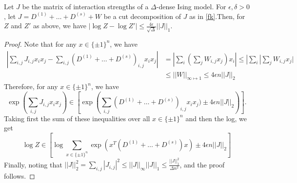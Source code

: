 \documentclass[final, 12pt]{colt2018}
\theoremstyle{definition}
\theoremstyle{plain}
\begin{document}
\begin{lemma}\label{applying-reg-lemma} Let $J$ be the matrix of interaction strengths of a $\Delta$-dense
Ising model. For $\epsilon,\delta>0$, let $J=D^{(1)}+\dots+D^{(s)}+W$
be a cut decomposition of $J$ as in \cref{fk}.Then, for $Z$ and $Z'$ as above, we have 
$|\log Z-\log Z'|\leq\frac{4\epsilon}{\sqrt{\Delta}}||J||_{1}$.

\end{lemma}
\begin{proof}
Note that for any $x\in\{\pm1\}^{n}$, we have 
\begin{align*}
|\sum_{i,j}J_{i,j}x_{i}x_{j}-\sum_{i,j}(D^{(1)}+\dots+D^{(s)})_{i,j}x_{i}x_{j}| & =|\sum_{i}(\sum_{j}W_{i,j}x_{j})x_{i}| \leq|\sum_{i}|\sum_{j}W_{i,j}x_{j}|\\
 & \leq||W||_{\infty\mapsto1} \leq4\epsilon n||J||_{2}
\end{align*}
Therefore, for any $x\in\{\pm1\}^{n}$, we have 
\[
\exp(\sum_{i,j}J_{i,j}x_{i}x_{j}) \in \left[ \exp\left(\sum_{i,j}(D^{(1)}+\dots+D^{(s)})_{i,j}x_{i}x_{j}) \pm 4\epsilon n||J||_{2}\right) \right].
\]
Taking first the sum of these inequalities over all $x\in\{\pm1\}^{n}$
and then the log, we get 
\[
\log Z \in \left[ \log\sum_{x\in\{\pm1\}^{n}}\exp \left(x^{T}(D^{(1)}+\dots+D^{(s)})x \right) \pm 4\epsilon n||J||_{2} \right]
\]
Finally, noting that $||J||_{2}^{2}=\sum_{i,j}|J_{i,j}|^{2}\leq||J||_{\infty}||J||_{1}\leq\frac{||J||_{1}^{2}}{\Delta n^{2}}$, and the proof follows.  
\end{proof}


\end{document}
